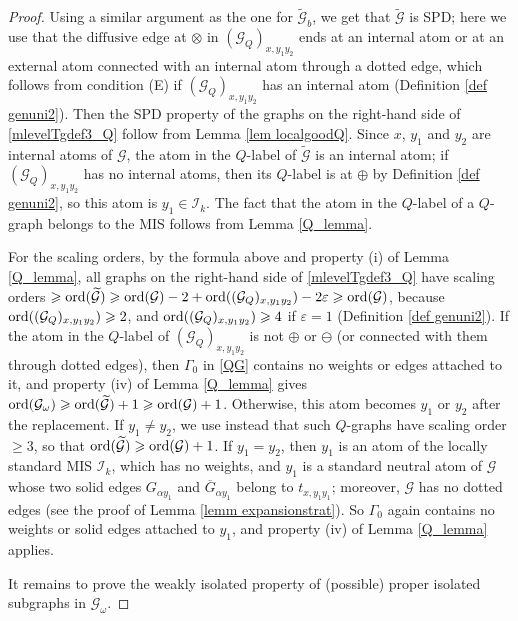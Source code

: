 \documentclass{article}
\newcommand{\1}{\mathds{1}}
\numberwithin{equation}{section}
\newcommand{\ord}{{\rm{ord}}}
\newcommand{\al}{\alpha}
\renewcommand{\cal}{\mathcal}
\newcommand{\wt}{\widetilde}
\renewcommand{\epsilon}{\varepsilon}
\renewcommand{\geq}{\geqslant}
\renewcommand{\ge}{\geq}
\newcommand{\dashed}{\text{diffusive}}
\theoremstyle{plain} %
\theoremstyle{remark}
\newcommand{\Iso}{{\mathcal I}}
\begin{document}
\begin{proof}
\vspace{5pt}
 Using a similar argument as the one for $\wt{\cal G}_b$, we get that $\wt {\cal G}$ is SPD; here we use that the $\dashed$ edge at $\otimes$ in $(\cal G_{Q})_{x,y_1y_2}$ ends at an internal atom or at an external atom connected with an internal atom through a dotted edge, which follows from condition (E) if $(\cal G_{Q})_{x,y_1y_2}$ has an internal atom (Definition \ref{def genuni2}). Then the SPD property of the graphs on the right-hand side of \eqref{mlevelTgdef3_Q} follow from Lemma \ref{lem localgoodQ}. Since $x$, $y_1$ and $y_2$ are internal atoms of $\cal G$, the atom in the $Q$-label of $\wt{\cal G}$ is an internal atom; if $(\cal G_{Q})_{x,y_1y_2}$ has no internal atoms, then its $Q$-label is at $\oplus$ by Definition \ref{def genuni2}, so this atom is $y_1\in \Iso_k$. The fact that the atom in the $Q$-label of a $Q$-graph belongs to the MIS follows from Lemma \ref{Q_lemma}.

For the scaling orders, by the formula above and property (i) of Lemma \ref{Q_lemma}, all graphs on the right-hand side of \eqref{mlevelTgdef3_Q} have scaling orders $\ge \ord(\wt{\cal G})\ge \ord(\cal G)-2+\ord((\cal G_{Q})_{x,y_1y_2})-2\epsilon\ge \ord(\cal G)$, because $\ord((\cal G_{Q})_{x,y_1y_2})\ge 2$, and $\ord((\cal G_{Q})_{x,y_1y_2})\ge 4$ if $\epsilon=1$ (Definition \ref{def genuni2}). If the atom in the $Q$-label of $(\cal G_{Q})_{x,y_1y_2}$ is not $\oplus$ or $\ominus$ (or connected with them through dotted edges), then $\Gamma_0$ in \eqref{QG} contains no weights or edges attached to it, and property (iv) of Lemma \ref{Q_lemma} gives $\ord(\cal G_\omega)\ge \ord(\wt{\cal G})+1\ge \ord(\cal G)+1$. Otherwise, this atom becomes $y_1$ or $y_2$ after the replacement. If $y_1\ne y_2$, we use instead that such $Q$-graphs have scaling order $\ge 3$, so that $\ord(\wt{\cal G})\ge \ord(\cal G)+1$. If $y_1=y_2$, then $y_1$ is an atom of the locally standard MIS $\Iso_k$, which has no weights, and $y_1$ is a standard neutral atom of $\cal G$ whose two solid edges $G_{\al y_1}$ and $\overline G_{\al y_1}$ belong to $t_{x,y_1y_1}$; moreover, $\cal G$ has no dotted edges (see the proof of Lemma \ref{lemm expansionstrat}). So $\Gamma_0$ again contains no weights or solid edges attached to $y_1$, and property (iv) of Lemma \ref{Q_lemma} applies.

It remains to prove the weakly isolated property of (possible) proper isolated subgraphs in $\cal G_{\omega}$.





\end{proof}
\end{document}
